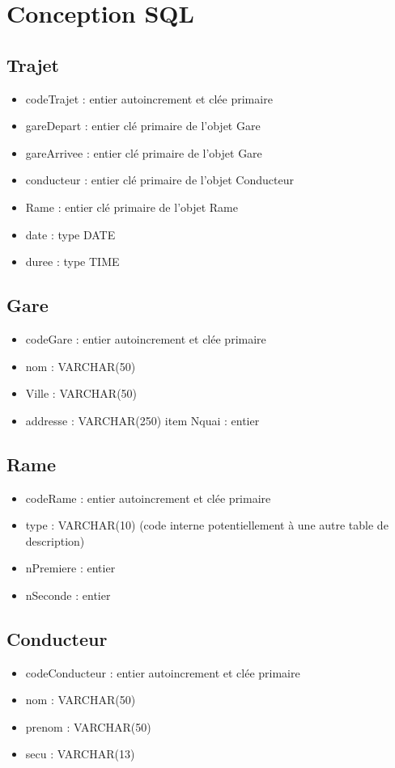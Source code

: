 \section{Conception SQL}
\subsection{Trajet}
\begin{itemize}
\item codeTrajet : entier autoincrement et clée primaire
\item gareDepart : entier clé primaire de l'objet Gare
\item gareArrivee : entier clé primaire de l'objet Gare
\item conducteur : entier clé primaire de l'objet Conducteur
\item Rame : entier clé primaire de l'objet Rame
\item date : type DATE
\item duree : type TIME
\end{itemize}

\subsection{Gare}
\begin{itemize}
\item codeGare : entier autoincrement et clée primaire
\item nom : VARCHAR(50)
\item Ville : VARCHAR(50)
\item addresse : VARCHAR(250)
  item Nquai : entier
\end{itemize}

\subsection{Rame}
\begin{itemize}
\item codeRame : entier autoincrement et clée primaire
\item type : VARCHAR(10) (code interne potentiellement à une autre table de description)
\item nPremiere : entier
\item nSeconde : entier
\end{itemize}


\subsection{Conducteur}
\begin{itemize}
\item codeConducteur : entier autoincrement et clée primaire
\item nom : VARCHAR(50)
\item prenom : VARCHAR(50)
\item secu : VARCHAR(13) 
\end{itemize}




